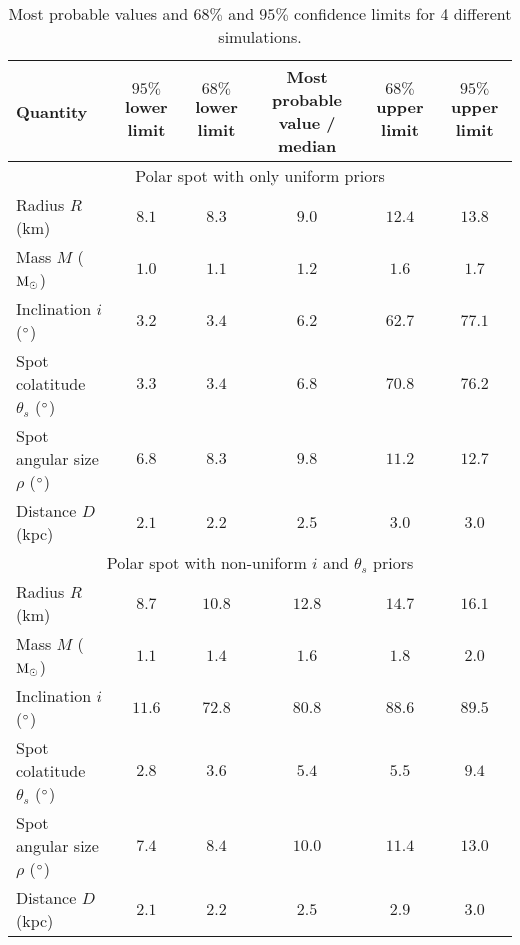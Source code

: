 \documentclass{wihuri}
\def\msun{{\rm M_{\odot}}}
\def\thetas{\theta_{s}}
\begin{document}
\begin{center}
\begin{table*}
  \caption{Most probable values and $68\%$ and $95\%$ confidence limits for 4 different simulations.}
\label{table:conflimits}
\begin{footnotesize}
\begin{center}
 \begin{adjustwidth}{-3cm}{}
  \begin{tabular}[c]{l c c c c c}
    \hline
    \hline
      Quantity & $95\%$ lower limit & $68\%$ lower limit & Most probable value / median & $68\%$ upper limit & $95\%$ upper limit \\ \hline
     \multicolumn{6}{c}{Polar spot with only uniform priors} \\ %
      Radius $R$ (km) & $8.1$ & $8.3$ & $9.0$ & $12.4$ & $13.8$  \\ %
      Mass $M$ ($\msun$) & $1.0$ & $1.1$ & $1.2$ & $1.6$ & $1.7$  \\ %
      Inclination $i$ ($\degree$) & $3.2$ & $3.4$ & $6.2$ & $62.7$ & $77.1$ \\ %
      Spot colatitude $\thetas$ ($\degree$) & $3.3$ & $3.4$ & $6.8$ & $70.8$ & $76.2$ \\ %
      Spot angular size $\rho$ ($\degree$) & $6.8$ & $8.3$ & $9.8$ & $11.2$ & $12.7$ \\ %
      Distance $D$ (kpc) & $2.1$ & $2.2$ & $2.5$ & $3.0$ & $3.0$ \\   \hline
      
      \multicolumn{6}{c}{Polar spot with non-uniform $i$ and $\thetas$ priors} \\ %
      Radius $R$ (km) & $8.7$ & $10.8$ & $12.8$ & $14.7$ & $16.1$  \\ %
      Mass $M$ ($\msun$) & $1.1$ & $1.4$ & $1.6$ & $1.8$ & $2.0$  \\ %
      Inclination $i$ ($\degree$) & $11.6$ & $72.8$ & $80.8$ & $88.6$ & $89.5$ \\ %
      Spot colatitude $\thetas$ ($\degree$) & $2.8$ & $3.6$ & $5.4$ & $5.5$ & $9.4$ \\ %
      Spot angular size $\rho$ ($\degree$) & $7.4$ & $8.4$ & $10.0$ & $11.4$ & $13.0$ \\ %
      Distance $D$ (kpc) & $2.1$ & $2.2$ & $2.5$ & $2.9$ & $3.0$ \\ \hline
      

\end{tabular}
\end{adjustwidth}
\end{center}
\end{footnotesize}
\end{table*}
\end{center}
\end{document}
